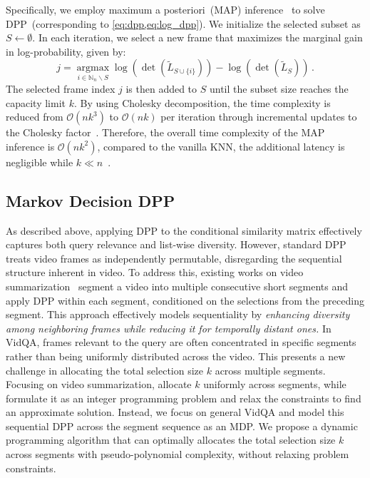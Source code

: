 Specifically, we employ maximum a posteriori~(MAP) inference~\cite{chen2018fast,ye2023compositional} to solve DPP~(corresponding to \cref{eq:dpp,eq:log_dpp}).
We initialize the selected subset as \(S \leftarrow \emptyset\).
In each iteration, we select a new frame that maximizes the marginal gain in log-probability, given by:
\begin{equation}\label{eq:greedy}
	j = \mathop{\mathrm{argmax}}\limits_{i\in \mathbb{N}_n \backslash S} \log\left(\det(\tilde{L}_{S \cup \{i\}})\right) - \log\left(\det(\tilde{L}_S)\right)\,.
\end{equation}
The selected frame index \(j\) is then added to \(S\) until the subset size reaches the capacity limit \(k\).
%
By using Cholesky decomposition, the time complexity is reduced from \(\mathcal{O}(nk^3)\) to \(\mathcal{O}(nk)\) per iteration through incremental updates to the Cholesky factor~\cite{chen2018fast}.
Therefore, the overall time complexity of the MAP inference is \(\mathcal{O}(nk^2)\), compared to the vanilla KNN, the additional latency is negligible while \(k \ll n\)~\cite{ye2023compositional}.


\subsection{Markov Decision DPP}\label{subsec:method_kdp}

As described above, applying DPP to the conditional similarity matrix effectively captures both query relevance and list-wise diversity.
However, standard DPP treats video frames as independently permutable, disregarding the sequential structure inherent in video.
%
To address this, existing works on video summarization~\cite{gong2014diverse,zheng2021k} segment a video into multiple consecutive short segments and apply DPP within each segment, conditioned on the selections from the preceding segment.
This approach effectively models sequentiality by \emph{enhancing diversity among neighboring frames while reducing it for temporally distant ones.}
%
In VidQA, frames relevant to the query are often concentrated in specific segments rather than being uniformly distributed across the video. 
This presents a new challenge in allocating the total selection size \(k\) across multiple segments.
%
Focusing on video summarization, \citet{gong2014diverse} allocate \(k\) uniformly across segments,
while \citet{zheng2021k} formulate it as an integer programming problem and relax the constraints to find an approximate solution.
%
Instead, we focus on general VidQA and model this sequential DPP across the segment sequence as an MDP. 
We propose a dynamic programming algorithm that can optimally allocates the total selection size \(k\) across segments with pseudo-polynomial complexity, without relaxing problem constraints.


